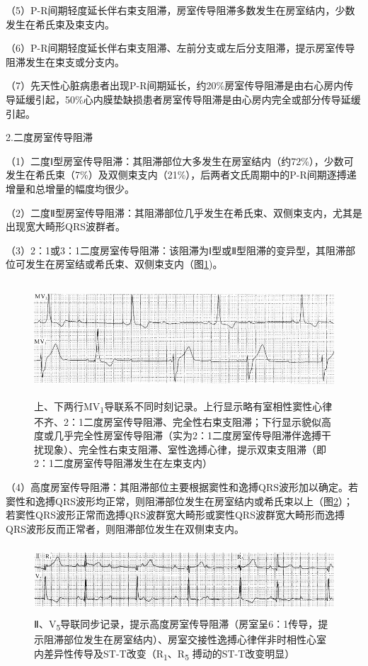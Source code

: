（5）P-R间期轻度延长伴右束支阻滞，房室传导阻滞多数发生在房室结内，少数发生在希氏束及束支内。

（6）P-R间期轻度延长伴右束支阻滞、左前分支或左后分支阻滞，提示房室传导阻滞发生在束支或分支内。

（7）先天性心脏病患者出现P-R间期延长，约20\%房室传导阻滞是由右心房内传导延缓引起，50\%心内膜垫缺损患者房室传导阻滞是由心房内完全或部分传导延缓引起。

2.二度房室传导阻滞

（1）二度Ⅰ型房室传导阻滞：其阻滞部位大多发生在房室结内（约72\%），少数可发生在希氏束（7\%）及双侧束支内（21\%），后两者文氏周期中的P-R间期逐搏递增量和总增量的幅度均很少。

（2）二度Ⅱ型房室传导阻滞：其阻滞部位几乎发生在希氏束、双侧束支内，尤其是出现宽大畸形QRS波群者。

（3）2：1或3：1二度房室传导阻滞：该阻滞为Ⅰ型或Ⅱ型阻滞的变异型，其阻滞部位可发生在房室结或希氏束、双侧束支内（图\ref{fig20-11})。

\begin{figure}[!htbp]
 \centering
 \includegraphics[width=5.58333in,height=1.6875in]{./images/Image00340.jpg}
 \captionsetup{justification=centering}
 \caption{上、下两行MV\textsubscript{1}导联系不同时刻记录。上行显示略有室相性窦性心律不齐、2：1二度房室传导阻滞、完全性右束支阻滞；下行显示貌似高度或几乎完全性房室传导阻滞（实为2：1二度房室传导阻滞伴逸搏干扰现象）、完全性右束支阻滞、室性逸搏心律，提示双束支阻滞（即2：1二度房室传导阻滞发生在左束支内）}
 \label{fig20-11}
  \end{figure} 


（4）高度房室传导阻滞：其阻滞部位主要根据窦性和逸搏QRS波形加以确定。若窦性和逸搏QRS波形均正常，则阻滞部位发生在房室结内或希氏束以上（图\ref{fig20-12}）；若窦性QRS波形正常而逸搏QRS波群宽大畸形或窦性QRS波群宽大畸形而逸搏QRS波形反而正常者，则阻滞部位发生在双侧束支内。

\begin{figure}[!htbp]
 \centering
 \includegraphics[width=5.58333in,height=1in]{./images/Image00341.jpg}
 \captionsetup{justification=centering}
 \caption{Ⅱ、V\textsubscript{5}导联同步记录，提示高度房室传导阻滞（房室呈6：1传导，提示阻滞部位发生在房室结内）、房室交接性逸搏心律伴非时相性心室内差异性传导及ST-T改变（R\textsubscript{1}、R\textsubscript{5} 搏动的ST-T改变明显）}
 \label{fig20-12}
  \end{figure} 


